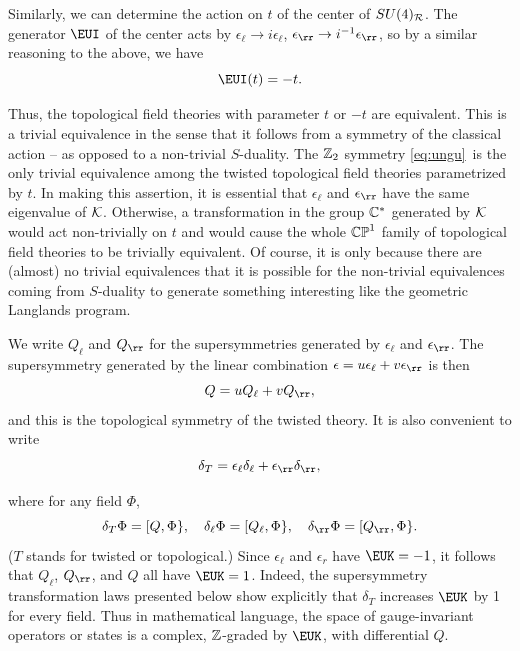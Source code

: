 Similarly, we can determine the action on $t$ of the center of
$SU(4)_{{\cal R}}$. The generator ${\EUI}$ of the center acts by
$\epsilon_\ell\to i\epsilon_\ell$, $\epsilon_\rr\to
i^{-1}\epsilon_\rr$, so by a similar reasoning to the above, we
have %
\setcounter{equation}{13}
\begin{equation}\label{eq:ungu}
{\EUI}(t)=-t.
\end{equation}

Thus, the topological field theories with parameter $t$ or $-t$
are equivalent. This is a trivial equivalence in the sense that it
follows from a symmetry of the classical action -- as opposed to a
non-trivial $S$-duality.  The $\Bbb{Z}_2$ symmetry \eqref{eq:ungu}\ is the
only trivial equivalence among the twisted topological field
theories parametrized by $t$. In making this assertion, it is
essential that $\epsilon_\ell$ and $\epsilon_\rr$ have the same
eigenvalue of ${\cal K}$. Otherwise, a transformation in the group
$\Bbb{C}^*$ generated by ${\cal K}$ would act non-trivially on $t$
and would cause the whole $\Bbb{CP}^1$ family of topological field
theories to be trivially equivalent.  Of course, it is only
because there are (almost) no trivial equivalences that it is
possible for the non-trivial equivalences coming from $S$-duality
to generate something interesting like the geometric Langlands
program.

We write $Q_\ell$ and $Q_\rr$ for the supersymmetries generated by
$\epsilon_\ell$ and $\epsilon_\rr$. The supersymmetry generated by
the linear combination $\epsilon=u\epsilon_\ell+v\epsilon_\rr$ is
then %
\setcounter{equation}{14}
\begin{equation}\label{eq:hut}
Q=uQ_\ell+vQ_\rr,
\end{equation}
 and this is the topological
symmetry of the twisted theory. It is also convenient to write
\setcounter{equation}{15}
\begin{equation}\label{eq:nut}
\delta_T=\epsilon_\ell\delta_\ell+\epsilon_\rr\delta_\rr,
\end{equation}

where for any field $\Phi$,
\setcounter{equation}{16}
\begin{equation}\label{eq:but}
\delta_T\Phi=[Q,\Phi\},~~~\delta_\ell\Phi=
[Q_\ell,\Phi\},~~~\delta_\rr\Phi=[Q_\rr,\Phi\}.
\end{equation}
 ($T$  stands for
twisted or topological.)  Since $\epsilon_\ell$ and $\epsilon_r$
have $\EUK=-1$, it follows that $Q_\ell$, $Q_\rr$, and $Q$ all
have $\EUK=1$. Indeed, the supersymmetry transformation laws
presented below show explicitly that $\delta_T$ increases $\EUK$
by 1 for every field.  Thus in mathematical language, the space of
gauge-invariant operators or states is a complex, $\Bbb{Z}$-graded
by $\EUK$, with differential $Q$.

